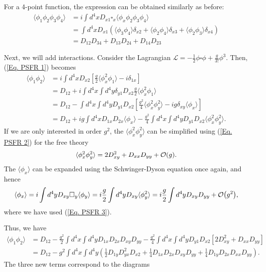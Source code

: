 \documentclass[11pt]{article}
\theoremstyle{definition}
\begin{document}
For a 4-point function, the expression can be obtained similarly as before:
\begin{equation}
\begin{aligned}
        \langle\phi_1\phi_2\phi_3\phi_4\rangle &= i \int d^4x D_{x1}\square_x\langle\phi_x\phi_2\phi_3\phi_4\rangle\\
        &= \int d^4x D_{x1}(\langle\phi_3\phi_4\rangle\delta_{x2} + \langle\phi_2\phi_4\rangle\delta_{x3} + \langle\phi_2\phi_3\rangle\delta_{x4})\\
        &= D_{12}D_{34} + D_{13}D_{24} + D_{14}D_{23}
        \label{Eq. PSFR 2}
\end{aligned}
\end{equation}


Next, we will add interactions. Consider the Lagrangian $\mathcal{L} =  -\frac{1}{2}\phi\square\phi + \frac{g}{3!}\phi^3$. Then, (\ref{Eq. PSFR 1}) becomes
\begin{equation}
\begin{aligned}
        \langle\phi_1\phi_2\rangle &= i\int d^4x D_{x2}[\frac{g}{2}\langle\phi_x^2\phi_1\rangle -i\delta_{1x} ]\\
        &= D_{12} + i\int d^4x \int d^4y \delta_{y1}D_{x2}\frac{g}{2}\langle\phi_x^2\phi_1\rangle\\
        &= D_{12} - \int d^4x \int d^4yD_{y1}D_{x2}[\frac{g^2}{4}\langle\phi_x^2\phi_y^2\rangle - ig\delta_{xy}\langle\phi_x\rangle]\\
        &=D_{12} + ig\int d^4 x D_{1x}D_{2x}\langle\phi_x\rangle -\frac{g^2}{4}\int d^4x \int d^4yD_{y1}D_{x2}\langle\phi_x^2\phi_y^2\rangle.
\end{aligned}
\end{equation}
If we are only interested in order $g^2$, the $\langle\phi_x^2\phi_y^2\rangle$ can be simplified using (\ref{Eq. PSFR 2}) for the free theory
\begin{equation}
    \langle\phi_x^2\phi_y^2\rangle = 2D_{xy}^2 + D_{xx}D_{yy} +\order{g}.
\end{equation}
The $\langle\phi_x\rangle$ can be expanded using the Schwinger-Dyson equation once again, and hence
\begin{equation}
    \langle\phi_x\rangle = i\int d^4y D_{xy} \square_y\langle\phi_y\rangle = i\frac{g}{2}\int d^4y D_{xy} \langle\phi_y^2\rangle = i\frac{g}{2}\int d^4y D_{xy} D_{yy} + \order{g^2},
\end{equation}
where we have used (\ref{Eq. PSFR 3}).

Thus, we have
\begin{equation}
\begin{aligned}
        \langle\phi_1\phi_2\rangle &= D_{12} - \frac{g^2}{2}\int d^4x \int d^4y D_{1x}D_{2x}D_{xy}D_{yy} -\frac{g^2}{4}\int d^4x \int d^4yD_{y1}D_{x2}[2D_{xy}^2 + D_{xx}D_{yy}]\\
        &= D_{12} - g^2\int d^4x \int d^4y (\frac{1}{2}D_{1y}D_{yx}^2D_{x2} + \frac{1}{4}D_{1x}D_{2x}D_{xy}D_{yy} + \frac{1}{4}D_{1y}D_{2x}D_{xx}D_{yy}).
        \label{Eq. PF expansion}
\end{aligned}
\end{equation}
The three new terms correspond to the diagrams
\end{document}
